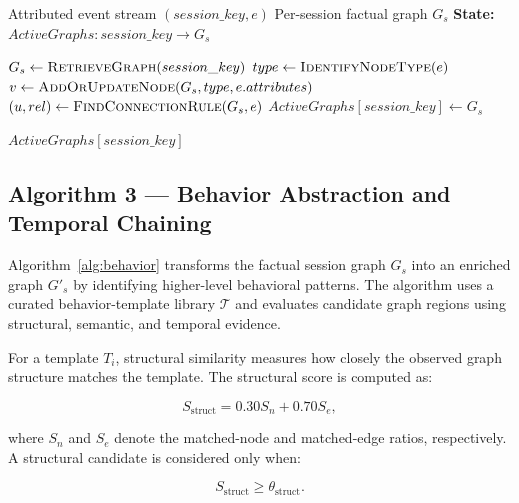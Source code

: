 \documentclass[conference]{IEEEtran}
\begin{document}
\begin{algorithm}[t]
\caption{Incremental Cross-Layer Graph Construction}
\label{alg:graph}
\small
\begin{algorithmic}[1]
\Require Attributed event stream $(session\_key,e)$
\Ensure Per-session factual graph $G_s$
\State \textbf{State:} $ActiveGraphs: session\_key \rightarrow G_s$

    \State $G_s \gets \Call{RetrieveGraph}{session\_key}$
    \State $type \gets \Call{IdentifyNodeType}{e}$
    \State $v \gets
    \Call{AddOrUpdateNode}{G_s,type,e.attributes}$
    \State $(u,rel) \gets \Call{FindConnectionRule}{G_s,e}$
        \State {}
    \EndIf
    \State {}
    \State $ActiveGraphs[session\_key] \gets G_s$
\EndProcedure

        \State \Return $ActiveGraphs[session\_key]$
    \Else
        \State \Return {}
    \EndIf
\EndFunction
\end{algorithmic}
\end{algorithm}

\subsection{Algorithm 3 --- Behavior Abstraction and Temporal Chaining}
\label{subsec:behavior}

Algorithm~\ref{alg:behavior} transforms the factual session graph $G_s$ into an enriched graph $G'_s$ by identifying higher-level behavioral patterns. The algorithm uses a curated behavior-template library $\mathcal{T}$ and evaluates candidate graph regions using structural, semantic, and temporal evidence.

For a template $T_i$, structural similarity measures how closely the observed graph structure matches the template. The structural score is computed as:

\begin{equation}
S_{\mathrm{struct}}
=
0.30S_n + 0.70S_e ,
\end{equation}

where $S_n$ and $S_e$ denote the matched-node and matched-edge ratios, respectively. A structural candidate is considered only when:

\begin{equation}
S_{\mathrm{struct}} \ge \theta_{\mathrm{struct}} .
\end{equation}
\end{document}
